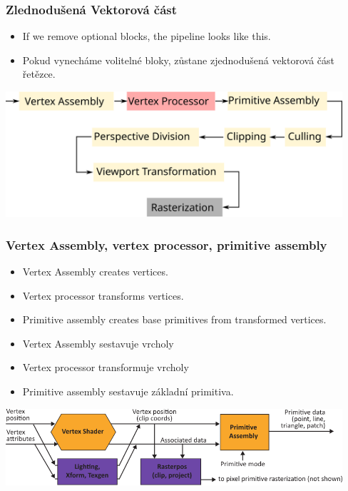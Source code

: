 \begin{frame}
\frametitle{Zlednodušená Vektorová část}
  \scriptsize
	\begin{itemize}
		\item If we remove optional blocks, the pipeline looks like this.
	\end{itemize}
	\begin{itemize}
		\item Pokud vynecháme volitelné bloky, zůstane zjednodušená vektorová část řetězce.
	\end{itemize}
	\includegraphics[width=12.5cm,keepaspectratio]{pics/pipeline/simplified_pipeline}
\end{frame}

\begin{frame}
\frametitle{Vertex Assembly, vertex processor, primitive assembly}
  \scriptsize
	\begin{itemize}
		\item Vertex Assembly creates vertices.
    \item Vertex processor transforms vertices.
    \item Primitive assembly creates base primitives from transformed vertices.
  \end{itemize}
	\begin{itemize}
		\item Vertex Assembly sestavuje vrcholy
    \item Vertex processor transformuje vrcholy
    \item Primitive assembly sestavuje základní primitiva.
	\end{itemize}
	\includegraphics[width=12.5cm,keepaspectratio]{pics/pipeline/OpenGL460PipelineVertexShader}
\end{frame}

